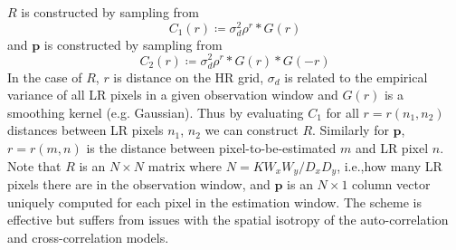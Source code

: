 %
\(R\) is constructed by sampling from
\begin{equation}
    C_1(r) \coloneqq \sigma_{d}^2 \rho^{r} \ast G(r)
\end{equation}
and \(\bm{p}\) is constructed by sampling from
\begin{equation}
    C_2(r) \coloneqq \sigma_d^2 \rho^{r} \ast G(r) \ast G(-r)
\end{equation}
In the case of \(R\), \(r\) is distance on the HR grid, \(\sigma_d\) is related to the empirical variance of all LR pixels in a given observation window and \(G(r)\) is a smoothing kernel (e.g. Gaussian).
%
Thus by evaluating \(C_1\) for all \(r = r(n_1, n_2)\) distances between LR pixels \(n_1\), \(n_2\) we can construct \(R\).
%
Similarly for \(\bm{p}\), \(r = r(m, n)\) is the distance between pixel-to-be-estimated \(m\) and LR pixel \(n\).
%
Note that \(R\) is an \(N \times N\) matrix where \(N = K W_x W_y/D_x D_y\), i.e.,how many LR pixels there are in the observation window, and \(\bm{p}\) is an \(N \times 1\) column vector uniquely computed for each pixel in the estimation window.
%
The scheme is effective but suffers from issues with the spatial isotropy of the auto-correlation and cross-correlation models.
